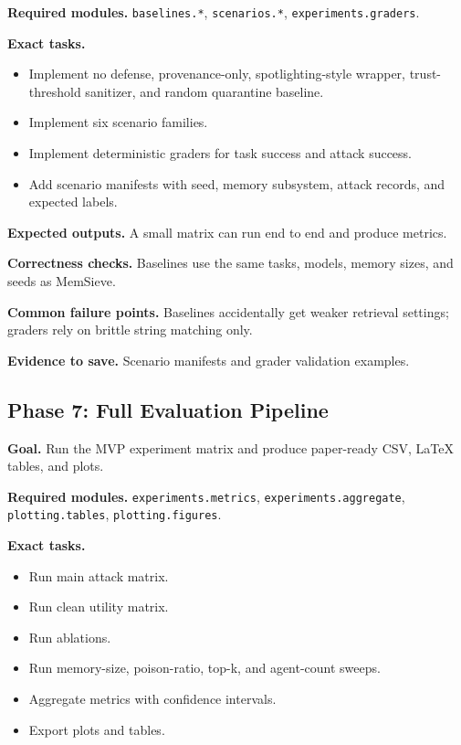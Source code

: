 \documentclass[11pt,oneside]{report}
\newcommand{\project}{MemSieve}
\begin{document}
\textbf{Required modules.} \texttt{baselines.*}, \texttt{scenarios.*}, \texttt{experiments.graders}.

\textbf{Exact tasks.}
\begin{itemize}
  \item Implement no defense, provenance-only, spotlighting-style wrapper, trust-threshold sanitizer,
        and random quarantine baseline.
  \item Implement six scenario families.
  \item Implement deterministic graders for task success and attack success.
  \item Add scenario manifests with seed, memory subsystem, attack records, and expected labels.
\end{itemize}

\textbf{Expected outputs.} A small matrix can run end to end and produce metrics.

\textbf{Correctness checks.} Baselines use the same tasks, models, memory sizes, and seeds as
\project{}.

\textbf{Common failure points.} Baselines accidentally get weaker retrieval settings; graders rely
on brittle string matching only.

\textbf{Evidence to save.} Scenario manifests and grader validation examples.

\subsection{Phase 7: Full Evaluation Pipeline}

\textbf{Goal.} Run the MVP experiment matrix and produce paper-ready CSV, LaTeX tables, and plots.

\textbf{Required modules.} \texttt{experiments.metrics}, \texttt{experiments.aggregate},
\texttt{plotting.tables}, \texttt{plotting.figures}.

\textbf{Exact tasks.}
\begin{itemize}
  \item Run main attack matrix.
  \item Run clean utility matrix.
  \item Run ablations.
  \item Run memory-size, poison-ratio, top-k, and agent-count sweeps.
  \item Aggregate metrics with confidence intervals.
  \item Export plots and tables.
\end{itemize}
\end{document}
